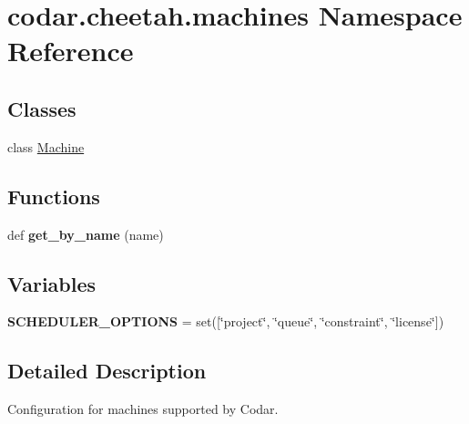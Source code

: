 \hypertarget{namespacecodar_1_1cheetah_1_1machines}{}\section{codar.\+cheetah.\+machines Namespace Reference}
\label{namespacecodar_1_1cheetah_1_1machines}
\subsection*{Classes}
\begin{DoxyCompactItemize}
\item 
class \hyperlink{classcodar_1_1cheetah_1_1machines_1_1_machine}{Machine}
\end{DoxyCompactItemize}
\subsection*{Functions}
\begin{DoxyCompactItemize}
\item 
\mbox{\label{namespacecodar_1_1cheetah_1_1machines_a21bfa37b2129a277b66617bece065786}} 
def {\bfseries get\+\_\+by\+\_\+name} (name)
\end{DoxyCompactItemize}
\subsection*{Variables}
\begin{DoxyCompactItemize}
\item 
\mbox{\label{namespacecodar_1_1cheetah_1_1machines_a8aae4d46d6b066d1f9ce5f802eb53b76}} 
{\bfseries S\+C\+H\+E\+D\+U\+L\+E\+R\+\_\+\+O\+P\+T\+I\+O\+NS} = set(\mbox{[}\char`\"{}project\char`\"{}, \char`\"{}queue\char`\"{}, \char`\"{}constraint\char`\"{}, \char`\"{}license\char`\"{}\mbox{]})
\end{DoxyCompactItemize}


\subsection{Detailed Description}
\begin{DoxyVerb}Configuration for machines supported by Codar.
\end{DoxyVerb}
 